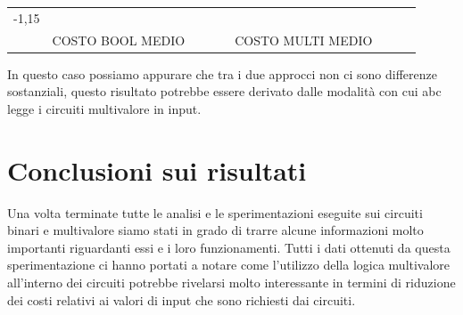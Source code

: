 \documentclass[italian,]{book}
\begin{document}
\begin{longtable}[]{@{}lllllllll@{}}
\begin{minipage}[t]{0.07\columnwidth}
-1,15\strut
\end{minipage}\tabularnewline
\begin{minipage}[t]{0.07\columnwidth}\raggedright
\strut
\end{minipage} & \begin{minipage}[t]{0.11\columnwidth}\raggedright
COSTO BOOL MEDIO\strut
\end{minipage} & \begin{minipage}[t]{0.08\columnwidth}\raggedright
\strut
\end{minipage} & \begin{minipage}[t]{0.07\columnwidth}\raggedright
\strut
\end{minipage} & \begin{minipage}[t]{0.09\columnwidth}\raggedright
\strut
\end{minipage} & \begin{minipage}[t]{0.12\columnwidth}\raggedright
COSTO MULTI MEDIO\strut
\end{minipage} & \begin{minipage}[t]{0.08\columnwidth}\raggedright
\strut
\end{minipage} & \begin{minipage}[t]{0.07\columnwidth}\raggedright
\strut
\end{minipage} & \begin{minipage}[t]{0.07\columnwidth}\raggedright
\strut
\end{minipage}\tabularnewline
\bottomrule
\end{longtable}

In questo caso possiamo appurare che tra i due approcci non ci sono differenze sostanziali, questo risultato potrebbe essere derivato dalle modalità con cui abc legge i circuiti multivalore in input.

\newpage

\hypertarget{conclusioni-sui-risultati}{%
\section{Conclusioni sui risultati}\label{conclusioni-sui-risultati}}

Una volta terminate tutte le analisi e le sperimentazioni eseguite sui circuiti binari e multivalore siamo stati in grado di trarre alcune informazioni molto importanti riguardanti essi e i loro funzionamenti. Tutti i dati ottenuti da questa sperimentazione ci hanno portati a notare come l'utilizzo della logica multivalore all'interno dei circuiti potrebbe rivelarsi molto interessante in termini di riduzione dei costi relativi ai valori di input che sono richiesti dai circuiti.
\end{document}
